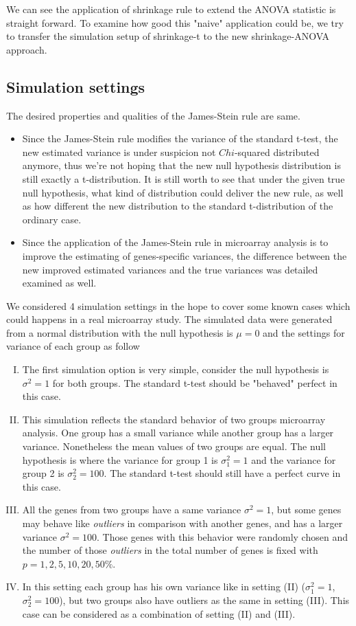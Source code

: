 We can see the application of shrinkage rule to extend the ANOVA statistic is straight forward. To examine how good this "naive" application could be, we try to transfer the simulation setup of shrinkage-t to the new shrinkage-ANOVA approach.
\subsection{Simulation settings}
The desired properties and qualities of the James-Stein rule are same.
\begin{itemize}
	\item Since the James-Stein rule modifies the variance of the standard t-test, the new estimated variance is under suspicion not $Chi$-squared distributed anymore, thus we're not hoping that the new null hypothesis distribution is still exactly a t-distribution. It is still worth to see that under the given true null hypothesis, what kind of distribution could deliver the new rule, as well as how different the new distribution to the standard t-distribution of the ordinary case.
	\item Since the application of the James-Stein rule in microarray analysis is to improve the estimating of genes-specific variances, the difference between the new improved estimated variances and the true variances was detailed examined as well.
\end{itemize}	
We considered 4 simulation settings in the hope to cover some known cases which could happens in a real microarray study. The simulated data were generated from a normal distribution with the null hypothesis is $\mu = 0$ and the settings for variance of each group as follow
\begin{enumerate}[(I)]
	\item The first simulation option is very simple, consider the null hypothesis is $\sigma^2 = 1$ for both groups. The standard t-test should be "behaved" perfect in this case.
	\item This simulation reflects the standard behavior of two groups microarray analysis. One group has a small variance while another group has a larger variance. Nonetheless the mean values of two groups are equal. The null hypothesis is where the variance for group 1 is $\sigma_1^2 = 1$ and the variance for group 2 is $\sigma_2^2 = 100$. The standard t-test should still have a perfect curve in this case.
	\item All the genes from two groups have a same variance $\sigma^2 = 1$, but some genes may behave like {\it outliers} in comparison with another genes, and has a larger variance $\sigma^2 = 100$. Those genes with this behavior were randomly chosen and the number of those {\it outliers} in the total number of genes is fixed with $p = 1, 2, 5, 10, 20, 50\%$.
	\item In this setting each group has his own variance like in setting (II) ($\sigma_1^2 = 1$, $\sigma_2^2 = 100$), but two groups also have outliers as the same in setting (III). This case can be considered as a combination of setting (II) and (III).
\end{enumerate}	
